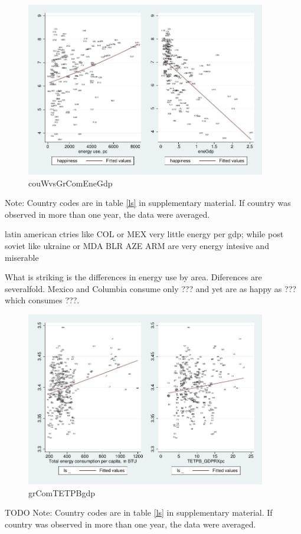 \documentclass[10pt, letterpaper]{article}
\begin{document}
\begin{spacing}{1.4}
\begin{figure}[H]
 \includegraphics[height=3in]{graphsAndTables/couWvsGrComEneGdp.pdf}\centering
\caption{couWvsGrComEneGdp}\label{couWvsGrComEneGdp}
\end{figure}
{\scriptsize Note: Country codes are in table \ref{ls} in supplementary
  material. If country was observed in more than one year, the data were averaged.}

latin american ctries like COL or MEX very little energy per gdp; while post
soviet like ukraine or MDA BLR AZE ARM are very energy intesive and miserable

What is striking is the differences in energy use by area. Diferences are
severalfold. Mexico and Columbia
consume only ??? and yet are as happy as ??? which consumes ???.

\begin{figure}[H]
 \includegraphics[height=3in]{graphsAndTables/grComTETPB_gdp.pdf}\centering
\caption{grComTETPBgdp}\label{grComTETPBgdp}
\end{figure}
{\scriptsize TODO Note: Country codes are in table \ref{ls} in supplementary
  material. If country was observed in more than one year, the data were averaged.}


\end{spacing}
\end{document}
